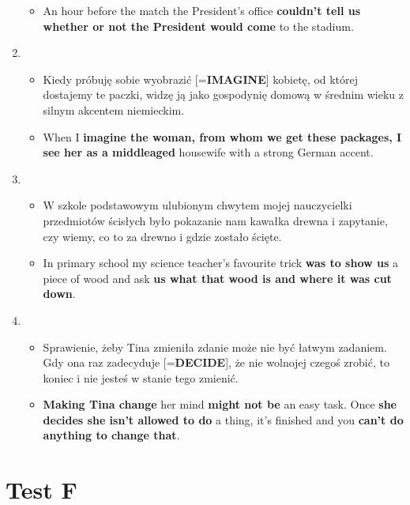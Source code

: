 \documentclass[a4paper]{article}
\begin{document}
\begin{enumerate}
\begin{itemize}
        \item An hour before the match the President's office {\bf couldn't tell us whether or not the President would come} to the stadium.
    \end{itemize}
    \item \begin{itemize}
        \item Kiedy próbuję sobie wyobrazić [={\bf IMAGINE}] kobietę, od której dostajemy te paczki, widzę ją jako gospodynię domową w średnim wieku z silnym akcentem niemieckim.
        \item When I {\bf imagine the woman, from whom we get these packages, I see her as a middleaged} housewife with a strong German accent.
    \end{itemize}
    \item \begin{itemize}
        \item W szkole podstawowym ulubionym chwytem mojej nauczycielki przedmiotów ścisłych było pokazanie nam kawałka drewna i zapytanie, czy wiemy, co to za drewno i gdzie zostało ścięte.
        \item In primary school my science teacher's favourite trick {\bf was to show us} a piece of wood and ask {\bf us what that wood is and where it was cut down}.
    \end{itemize}
    \item \begin{itemize}
        \item Sprawienie, żeby Tina zmieniła zdanie może nie być łatwym zadaniem. Gdy ona raz zadecyduje [={\bf DECIDE}], że nie wolnojej czegoś zrobić, to koniec i nie jesteś w stanie tego zmienić.
        \item {\bf Making Tina change} her mind {\bf might not be} an easy task. Once {\bf she decides she isn't allowed to do} a thing, it's finished and you {\bf can't do anything to change that}.
    \end{itemize}
\end{enumerate}
\section{Test F}
\end{document}
